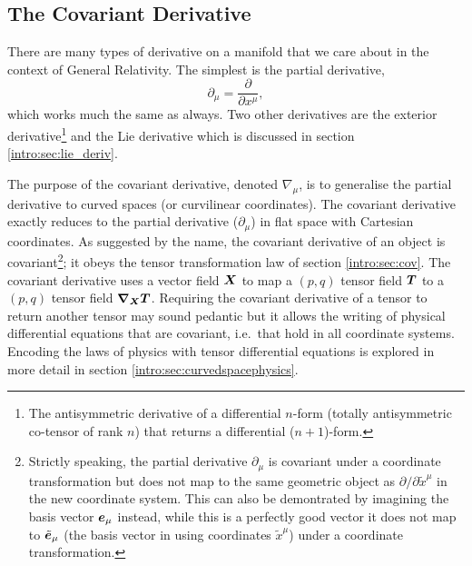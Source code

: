 \subsection{The Covariant Derivative}\label{intro:sec:covariant_derivative}

There are many types of derivative on a manifold that we care about in the context of General Relativity. The simplest is the partial derivative,
\begin{equation}
\partial_\mu = \frac{\partial}{\partial x^\mu},
\end{equation}
which works much the same as always. Two other derivatives are the exterior derivative\footnote{The antisymmetric derivative of a differential $n$-form (totally antisymmetric co-tensor of rank $n$) that returns a differential ($n+1$)-form. } and the Lie derivative which is discussed in section \ref{intro:sec:lie_deriv}.

The purpose of the covariant derivative, denoted $\nabla_\mu$, is to generalise
the partial derivative to curved spaces (or curvilinear coordinates).
The covariant derivative exactly reduces to the partial derivative ($\partial_\mu$)
in flat space with Cartesian coordinates. As suggested by the name, the covariant
derivative of an object is covariant\footnote
{Strictly speaking, the partial derivative $\partial_\mu$ is covariant
under a coordinate transformation but does not map to the same geometric object as
$\partial/\partial \tilde{x}^\mu$ in the new coordinate system. This can also be
demontrated by imagining the basis vector $\boldsymbol{e}_\mu$ instead, while this is a perfectly good
vector it does not map to $\tilde{\boldsymbol{e}}_\mu$ (the basis vector in using coordinates
$\tilde{x}^\mu$) under a coordinate transformation.
}; it obeys the tensor transformation law of
section \ref{intro:sec:cov}.
The covariant derivative uses a vector field $\boldsymbol{X}$
to map a $(p,q)$ tensor field $\boldsymbol{T}$ to
a $(p,q)$ tensor field ${\boldsymbol{\nabla}_{\boldsymbol{X}}} \boldsymbol{T}$. Requiring the covariant
derivative of a tensor to return another tensor may sound pedantic but it allows
the writing of physical differential equations that are covariant, i.e.~that hold
in all coordinate systems. Encoding the laws of physics with tensor differential
equations is explored in more detail in section \ref{intro:sec:curvedspacephysics}.

